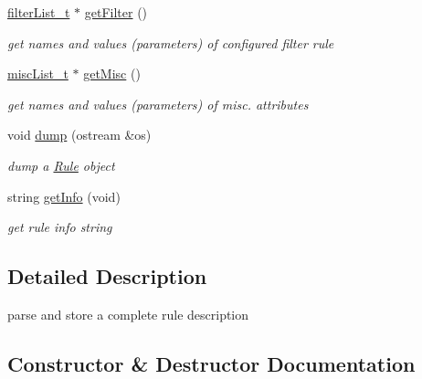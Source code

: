 \begin{DoxyCompactItemize}
\hyperlink{ProcModuleInterface_8h_a2afc1e9fc63b2cfcd86ec2435f24e27c}{filter\+List\+\_\+t} $\ast$ \hyperlink{classRule_ad247112cb17b723d048dadf4afe34fa6}{get\+Filter} ()
\begin{DoxyCompactList}\small\item\em get names and values (parameters) of configured filter rule \end{DoxyCompactList}\item 
\hyperlink{Rule_8h_a9fb303c0fc85a5e78d6d35728fe7fe74}{misc\+List\+\_\+t} $\ast$ \hyperlink{classRule_a37927201f07b2990cdd342162c7ddf96}{get\+Misc} ()
\begin{DoxyCompactList}\small\item\em get names and values (parameters) of misc. attributes \end{DoxyCompactList}\item 
\mbox{\label{classRule_ac88b5cc900b2e39dc3c674bb259f1e86}} 
void \hyperlink{classRule_ac88b5cc900b2e39dc3c674bb259f1e86}{dump} (ostream \&os)
\begin{DoxyCompactList}\small\item\em dump a \hyperlink{classRule}{Rule} object \end{DoxyCompactList}\item 
\mbox{\label{classRule_ac67bda46af62221c2e02e5338b47cc6a}} 
string \hyperlink{classRule_ac67bda46af62221c2e02e5338b47cc6a}{get\+Info} (void)
\begin{DoxyCompactList}\small\item\em get rule info string \end{DoxyCompactList}\end{DoxyCompactItemize}


\subsection{Detailed Description}
parse and store a complete rule description 

\subsection{Constructor \& Destructor Documentation}
\mbox{\label{classRule_af5a5d5dedcf5fce8b376e1041df916f6}} 
